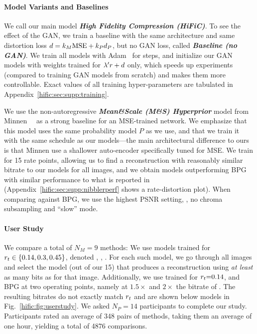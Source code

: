 \paragraph{Model Variants and Baselines} 
We call our main model \emph{\textbf{High Fidelity Compression (HiFiC)}}.
To see the effect of the GAN, we train a baseline with the same architecture and same distortion loss $d=k_M \text{MSE} + k_P d_P$, but no GAN loss, called \emph{\textbf{Baseline (no GAN)}}.
We train all models with Adam~\cite{kingma2014adam} for  steps,
and initialize our GAN models with weights trained for $\lambda' r+d$ 
only, which speeds up experiments (compared to training GAN models from scratch) and makes them more controllable. 
Exact values of all training hyper-parameters are tabulated in Appendix~\ref{hific:sec:supp:training}.

We use the non-autoregressive \emph{\textbf{Mean\&Scale (M\&S) Hyperprior}} model from Minnen~\etal~\cite{minnen2018joint} as a strong baseline for an MSE-trained network.
We emphasize that this model uses the same probability model $P$ as we use, and that we train it with the same schedule as our models---the main architectural difference to ours is that Minnen \etal use a shallower auto-encoder specifically tuned for MSE.
We train \eblminnen for 15 rate points, allowing us to find a reconstruction with reasonably similar bitrate to our models for all images, and we obtain models outperforming BPG with similar performance to what is reported in~\cite{minnen2018joint} (Appendix~\ref{hific:sec:supp:nibblerperf} shows a rate-distortion plot). When comparing against BPG, we use the highest PSNR setting, \ie, no chroma subsampling and ``slow'' mode. 
 

\paragraph{User Study}
We compare a total of $N_M{=}9$ methods:
We use \ename models trained for $r_t \in \{0.14, 0.3, 0.45\}$, denoted \textbf{\enamelo}, \textbf{\enamemi}, \textbf{\enamehi}. 
For each such model, we go through all images and select the \eblminnen model (out of our 15) that produces a reconstruction using \emph{at least} as many bits as \ename for that image. 
Additionally, we use \eblmselpips trained for $r_t{=}0.14$,
and BPG at two operating points, namely at $1.5{\times}$ and $2{\times}$ the bitrate of \enamemi.
The resulting bitrates do not exactly match $r_t$ and are shown below models in Fig.~\ref{hific:fig:userstudy}.
We asked $N_P{=}14$ participants to complete our study.
Participants rated an average of 348 pairs of methods, taking them an average of one hour, yielding a total of 4876 comparisons. 

